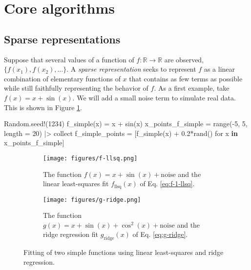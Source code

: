 \documentclass[
]{article}
\newenvironment{Shaded}{\begin{snugshade}}{\end{snugshade}}
\newcommand{\BuiltInTok}[1]{\textcolor[rgb]{0.00,0.23,0.31}{#1}}
\newcommand{\FloatTok}[1]{\textcolor[rgb]{0.68,0.00,0.00}{#1}}
\newcommand{\FunctionTok}[1]{\textcolor[rgb]{0.28,0.35,0.67}{#1}}
\newcommand{\KeywordTok}[1]{\textcolor[rgb]{0.00,0.23,0.31}{\textbf{#1}}}
\newcommand{\NormalTok}[1]{\textcolor[rgb]{0.00,0.23,0.31}{#1}}
\newcommand{\OperatorTok}[1]{\textcolor[rgb]{0.37,0.37,0.37}{#1}}
\begin{document}
\section{Core algorithms}\label{core-algorithms}

\subsection{Sparse representations}\label{sparse-representations}

Suppose that several values of a function of
\(f : \mathbb{R} \to \mathbb{R}\) are observed,
\(\{f(x_1), f(x_2), \dots \}\). A \emph{sparse representation} seeks to
represent \(f\) as a linear combination of elementary functions of \(x\)
that contains as few terms as possible while still faithfully
representing the behavior of \(f\). As a first example, take
\(f(x) = x + \sin(x)\). We will add a small noise term to simulate real
data. This is shown in Figure \ref{fig:f-llsq}.

\begin{Shaded}
\begin{Highlighting}[]
\BuiltInTok{Random}\NormalTok{.}\FunctionTok{seed!}\NormalTok{(}\FloatTok{1234}\NormalTok{)}
\FunctionTok{f\_simple}\NormalTok{(x) }\OperatorTok{=}\NormalTok{ x }\OperatorTok{+} \FunctionTok{sin}\NormalTok{(x)}
\NormalTok{x\_points\_f\_simple }\OperatorTok{=} \FunctionTok{range}\NormalTok{(}\OperatorTok{{-}}\FloatTok{5}\NormalTok{, }\FloatTok{5}\NormalTok{, length }\OperatorTok{=} \FloatTok{20}\NormalTok{) }\OperatorTok{|\textgreater{}}\NormalTok{ collect}
\NormalTok{f\_simple\_points }\OperatorTok{=}\NormalTok{ [}\FunctionTok{f\_simple}\NormalTok{(x) }\OperatorTok{+} \FloatTok{0.2}\FunctionTok{*rand}\NormalTok{() for x }\KeywordTok{in}\NormalTok{ x\_points\_f\_simple]}
\end{Highlighting}
\end{Shaded}

\begin{figure}
\centering
\begin{subfigure}{0.49\textwidth}
    \texttt{[image: figures/f-llsq.png]}
    \caption{The function $f(x) = x + \sin(x) + \text{noise}$ and the linear least-squares fit $f_\text{llsq}(x)$ of Eq. \eqref{eq:f-1-llsq}.}
    \label{fig:f-llsq}
\end{subfigure}
\hfill
\begin{subfigure}{0.49\textwidth}
    \texttt{[image: figures/g-ridge.png]}
    \caption{The function $g(x) = x + \sin(x) + \cos^2(x) + \text{noise}$ and the ridge regression fit $g_\text{ridge}(x)$ of Eq. \eqref{eq:g-ridge}.}
    \label{fig:g-ridge}
\end{subfigure}
        
\caption{Fitting of two simple functions using linear least-squares and ridge regression.}
\label{fig:fig-sparse-motivation}
\end{figure}
\end{document}
